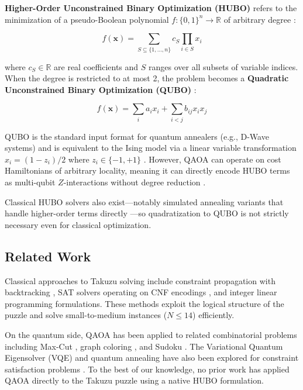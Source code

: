 \documentclass[eng]{ajceam-class}
\begin{document}
\textbf{Higher-Order Unconstrained Binary Optimization (HUBO)} refers to the minimization of a pseudo-Boolean polynomial $f: \{0,1\}^n \rightarrow \mathbb{R}$ of arbitrary degree \cite{boros2002pseudo}:

\begin{equation}
 f(\mathbf{x}) = \sum_{S \subseteq \{1,\ldots,n\}} c_S \prod_{i \in S} x_i
\end{equation}

where $c_S \in \mathbb{R}$ are real coefficients and $S$ ranges over all subsets of variable indices. When the degree is restricted to at most 2, the problem becomes a \textbf{Quadratic Unconstrained Binary Optimization (QUBO)} \cite{kochenberger2014qubo}:

\begin{equation}
 f(\mathbf{x}) = \sum_{i} a_i x_i + \sum_{i < j} b_{ij} x_i x_j
\end{equation}

QUBO is the standard input format for quantum annealers (e.g., D-Wave systems) and is equivalent to the Ising model via a linear variable transformation $x_i = (1 - z_i)/2$ where $z_i \in \{-1, +1\}$ \cite{lucas2014ising}. However, QAOA can operate on cost Hamiltonians of arbitrary locality, meaning it can directly encode HUBO terms as multi-qubit $Z$-interactions without degree reduction \cite{hadfield2019qaoa}.

Classical HUBO solvers also exist---notably simulated annealing variants that handle higher-order terms directly \cite{ishikawa2011transformation}---so quadratization to QUBO is not strictly necessary even for classical optimization.

\subsection{Related Work}

Classical approaches to Takuzu solving include constraint propagation with backtracking \cite{apt2003constraint}, SAT solvers operating on CNF encodings \cite{biere2009sat}, and integer linear programming formulations. These methods exploit the logical structure of the puzzle and solve small-to-medium instances ($N \leq 14$) efficiently.

On the quantum side, QAOA has been applied to related combinatorial problems including Max-Cut \cite{farhi2014qaoa}, graph coloring \cite{tabi2020quantum}, and Sudoku \cite{anis2022sudoku}. The Variational Quantum Eigensolver (VQE) and quantum annealing have also been explored for constraint satisfaction problems \cite{lucas2014ising}. To the best of our knowledge, no prior work has applied QAOA directly to the Takuzu puzzle using a native HUBO formulation.
\end{document}
